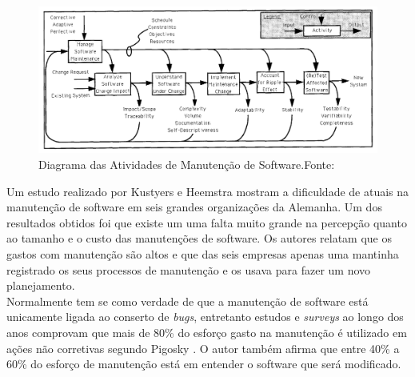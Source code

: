 \graphicspath{{figuras/}}
\begin{figure}
\centering
\includegraphics[scale=0.50]{Manutencao}
\caption{Diagrama das Atividades de Manutenção de Software.Fonte:\cite{pfleeger_framework_1990}}
\label{img:modelo_manutencao}
\end{figure}
Um estudo realizado por Kustyers e Heemstra \cite{kusters} mostram a dificuldade de atuais na manutenção de software em seis grandes organizações da Alemanha. Um dos resultados obtidos foi que existe um uma falta muito grande na percepção quanto ao tamanho e o custo das manutenções de software. Os autores relatam que os gastos com manutenção são altos e que das seis empresas apenas uma mantinha registrado os seus processos de manutenção e os usava para fazer um novo planejamento. 
\\Normalmente tem se como verdade de que a manutenção de software está unicamente ligada ao conserto de \textit{bugs}, entretanto estudos e \textit{surveys} ao longo dos anos comprovam que mais de 80\% do esforço gasto na manutenção é utilizado em ações não corretivas segundo Pigosky \cite{pigosky}. O autor também afirma que entre 40\% a 60\% do esforço de manutenção está em entender o software que será modificado.
 

